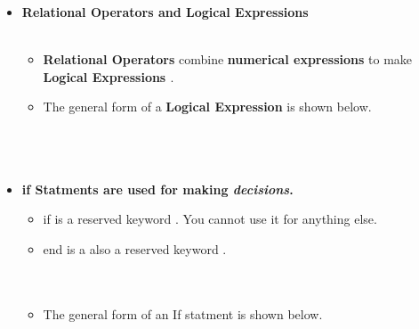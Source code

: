 \documentclass[11pt]{article}
\newcommand{\B}{\color{blue}}
\newcommand{\G}{\color{mygreen}}
\newcommand{\PR}{\color{mypurple}}
\begin{document}
\begin{itemize}
					\item \textbf{ \LARGE \color{blue}Relational Operators \color{black} and \color{mypurple}Logical Expressions \color{black}}\\\\
		\begin{itemize}
					\item {\bf{\B Relational Operators}} combine {\bf{\G numerical expressions}} to make {\bf{\PR Logical Expressions }}.\vspace{20mm}\\
					\item The general form of a {\bf{\PR Logical Expression}} is shown below. \vspace{20mm}\\

						  \\
						 \\\\
			
				\end{itemize}
				\newpage
				
					\item \textbf{ \LARGE \color{blue}if \color{black} Statments are used for making {\it decisions}.}\\
		\begin{itemize}
					\item \color{blue}if \color{black} is a reserved \color{mypurple} keyword \color{black}. You cannot use it for anything else. \\
					\item \color{blue}end \color{black} is a also a reserved \color{mypurple} keyword \color{black}. \\\\\\
					\item The general form of an \color{blue}If \color{black} statment is shown below. \vspace{20mm}\\ \\


\end{itemize}
\end{itemize}
\end{document}
